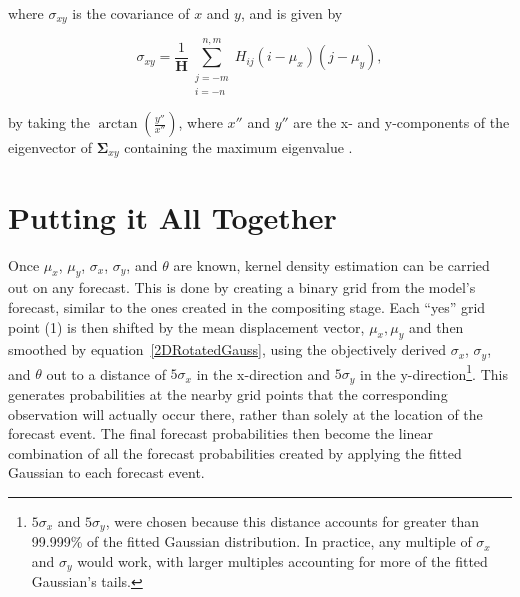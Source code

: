 \noindent where $\sigma_{xy}$ is the covariance of $x$ and $y$, and is given by

    \begin{equation}
        \label{sigmaxy}
        \sigma_{xy} = \frac{1}{\mathbf{H}} \sum\limits_{\substack{j=-m \\ i=-n}}^{n,m}H_{ij}(i - \mu_x)(j - \mu_y),
    \end{equation}

\noindent by taking the $\arctan{\left(\frac{y''}{x''}\right)}$, where $x''$ and $y''$ are the x- and y-components of the eigenvector of $\boldsymbol{\Sigma}_{xy}$ containing the maximum eigenvalue \citep{Lak2010}.




\section{Putting it All Together}
\label{kde}

Once $\mu_x$, $\mu_y$, $\sigma_x$, $\sigma_y$, and $\theta$ are known, kernel density estimation can be carried out on any forecast.
This is done by creating a binary grid from the model's forecast, similar to the ones created in the compositing stage.
Each ``yes'' grid point (1) is then shifted by the mean displacement vector, ${\mu_x, \mu_y}$ and then smoothed by \mbox{equation \ref{2DRotatedGauss}}, using the objectively derived $\sigma_x$, $\sigma_y$, and $\theta$ out to a distance of $5\sigma_x$ in the x-direction and $5\sigma_y$ in the y-direction\footnote{$5\sigma_x$ and $5\sigma_y$, were chosen because this distance accounts for greater than 99.999\% of the fitted Gaussian distribution.
In practice, any multiple of $\sigma_x$ and $\sigma_y$ would work, with larger multiples accounting for more of the fitted Gaussian's tails.}.
This generates probabilities at the nearby grid points that the corresponding observation will actually occur there, rather than solely at the location of the forecast event.
The final forecast probabilities then become the linear combination of all the forecast probabilities created by applying the fitted Gaussian to each forecast event.







